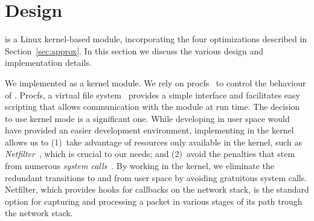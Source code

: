 \section{\oursys Design}\label{sec:design}
\oursys is a Linux kernel-based module, incorporating the four optimizations described in Section~\ref{sec:approx}. In this section we discuss the various design and implementation details. 


 We implemented \oursys as a kernel module. We rely on procfs~\cite{proc} to control the behaviour of \oursys. Procfs, a virtual file system~\cite{virtfs} provides a simple interface and facilitates easy scripting that allows communication with the module at run time.
The decision to use kernel mode is a significant one. While developing in user space would have provided an easier development environment, implementing \oursys in the kernel allows us to (1)~take advantage of resources only available in the kernel, such as \textit{Netfilter}~\cite{netfilter}, which is crucial to our needs; and (2)~avoid the penalties that stem from numerous \textit{system calls}~\cite{Copy, FlexSC}. By working in the kernel, we eliminate the redundant transitions to and from user space by avoiding gratuitous system calls. Netfilter, which provides hooks for callbacks on the network stack, is the standard option for capturing and processing a packet in various stages of its path trough the network stack.  


